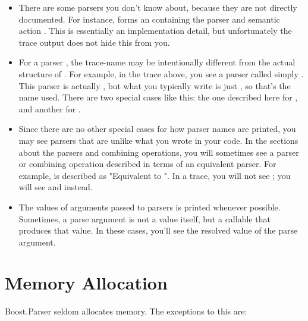 \documentclass{MyBook}
\begin{document}
\begin{itemize}
\item
  There are some parsers you don't know about, because they are not directly documented. For instance,  forms an  containing the parser  and semantic action . This is essentially an implementation detail, but unfortunately the trace output does not hide this from you.
\item
  For a parser , the trace-name may be intentionally different from the actual structure of . For example, in the trace above, you see a parser called simply . This parser is actually , but what you typically write is just , so that's the name used. There are two special cases like this: the one described here for , and another for .
\item
  Since there are no other special cases for how parser names are printed, you may see parsers that are unlike what you wrote in your code. In the sections about the parsers and combining operations, you will sometimes see a parser or combining operation described in terms of an equivalent parser. For example,  is described as "Equivalent to ". In a trace, you will not see ; you will see  and  instead.
\item
  The values of arguments passed to parsers is printed whenever possible. Sometimes, a parse argument is not a value itself, but a callable that produces that value. In these cases, you'll see the resolved value of the parse argument.
\end{itemize}

\section{Memory Allocation}

Boost.Parser seldom allocates memory. The exceptions to this are:
\end{document}
